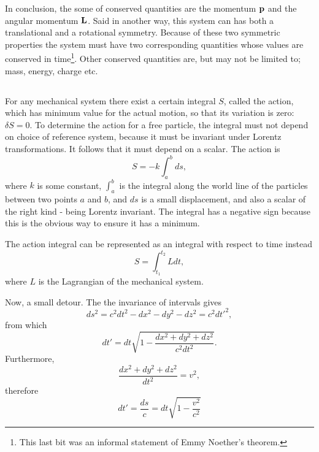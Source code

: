 \documentclass[11pt]{amsart}
\begin{document}
In conclusion, the some of conserved quantities are the momentum $\vb{p}$ and the angular momentum $\vb{L}$. Said in another way, this system can has both a translational and a rotational symmetry. Because of these two symmetric properties the system must have two corresponding quantities whose values are conserved in time\footnote{This last bit was an informal statement of Emmy Noether's theorem.}. Other conserved quantities are, but may not be limited to; mass, energy, charge etc.

\subsection{}
For any mechanical system there exist a certain integral $S$, called the action, which has minimum value for the actual motion, so that its variation is zero: $\delta S = 0$. To determine the action for a free particle, the integral must not depend on choice of reference system, because it must be invariant under Lorentz transformations. It follows that it must depend on a scalar. The action is
\begin{equation}
\label{eq:action1}
S = -k \int_a^b ds,
\end{equation}
where $k$ is some constant, $\int_a^b$ is the integral along the world line of the particles between two points $a$ and $b$, and $ds$ is a small displacement, and also a scalar of the right kind - being Lorentz invariant. The integral has a negative sign because this is the obvious way to ensure it has a minimum. 

The action integral can be represented as an integral with respect to time instead
\begin{equation}
S = \int_{t_1}^{t_2} Ldt,
\end{equation}
where $L$ is the Lagrangian of the mechanical system.

Now, a small detour. The the invariance of intervals gives
\begin{equation*}
ds^2 = c^2dt^2-dx^2-dy^2-dz^2=c^2dt'^2,
\end{equation*}
from  which
\begin{equation*}
dt' = dt\sqrt{1-\frac{dx^2+dy^2+dz^2}{c^2dt^2}}.
\end{equation*}
Furthermore,
\begin{equation*}
\frac{dx^2 + dy^2+dz^2}{dt^2} = v^2,
\end{equation*}
therefore
\begin{equation}
\label{eq:threetwo}
dt' = \frac{ds}{c} = dt\sqrt{1-\frac{v^2}{c^2}}
\end{equation}
\end{document}
